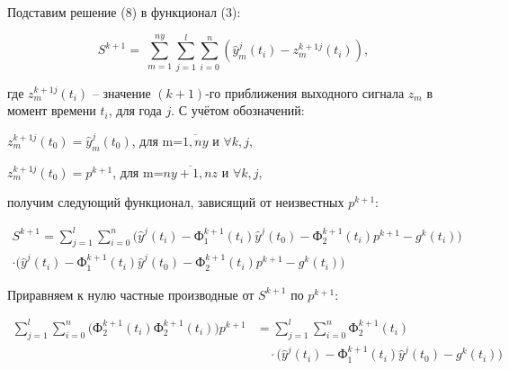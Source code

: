 \begin{multicols}{2}
Подставим решение (8) в функционал (3):

\begin{equation}
S^{k + 1} = \ \sum_{m = 1}^{ny}{\sum_{j = 1}^{l}{\sum_{i = 0}^{n}\left( {\widehat{y}}_{m}^{j}\left( t_{i} \right) - z_{m}^{k + 1j}(t_{i}) \right)}},
\end{equation}

где
\(z_{m}^{k + 1j}(t_{i})\)
-- значение \((k + 1)\)-го приближения выходного сигнала \(z_{m}\) в
момент времени \(t_{i}\), для года $j$. С учётом обозначений:

\(z_{m}^{k + 1j}\left( t_{0} \right) = {\widehat{y}}_{m}^{j}(t_{0})\),
для m=\(\overline{1,ny}\) и $∀ k, j$,

\(z_{m}^{k + 1j}\left( t_{0} \right) = p^{k + 1}\),
для m=\(\overline{ny + 1,nz}\) и $∀ k, j$,

получим следующий функционал, зависящий от неизвестных
\(p^{k + 1}\):
\end{multicols}

\begin{equation}
\begin{split}
S^{k + 1} = \sum_{j = 1}^{l} \sum_{i = 0}^{n} \Big( \widehat{y}^{j}(t_{i}) 
    - \text{Ф}_{1}^{k + 1}(t_{i}) \widehat{y}^{j}(t_{0}) 
    - \text{Ф}_{2}^{k + 1}(t_{i}) p^{k + 1} - g^{k}(t_{i}) \Big) \\
    \cdot \Big( \widehat{y}^{j}(t_{i}) 
    - \text{Ф}_{1}^{k + 1}(t_{i}) \widehat{y}^{j}(t_{0}) 
    - \text{Ф}_{2}^{k + 1}(t_{i}) p^{k + 1} - g^{k}(t_{i}) \Big)
\end{split}
\end{equation}

Приравняем к нулю частные производные от
\(S^{k + 1}\) по
\(p^{k + 1}\):

\begin{equation}
\begin{split}
\sum_{j = 1}^{l} \sum_{i = 0}^{n} 
\Big( \text{Ф}_{2}^{k + 1}(t_{i}) \text{Ф}_{2}^{k + 1}(t_{i}) \Big) p^{k + 1} 
&= \sum_{j = 1}^{l} \sum_{i = 0}^{n} \text{Ф}_{2}^{k + 1}(t_{i}) \\
&\quad \cdot \Big( \widehat{y}^{j}(t_{i}) 
    - \text{Ф}_{1}^{k + 1}(t_{i}) \widehat{y}^{j}(t_{0}) 
    - g^{k}(t_{i}) \Big)
\end{split}
\end{equation}

